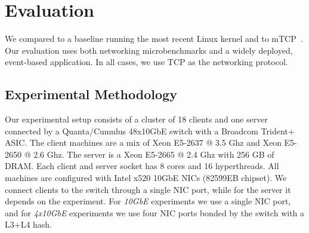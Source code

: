 
\section{Evaluation}
\label{sec:eval}


We compared \ix to a baseline running the most recent Linux kernel and
to mTCP~\cite{jeong2014mtcp}. Our evaluation uses both networking
microbenchmarks and a widely deployed, event-based application. In all
cases, we use TCP as the networking protocol.

\subsection{Experimental Methodology}
\label{sec:eval:setup}



 





Our experimental setup consists of a cluster of 18 clients
and one server connected by
a Quanta/Cumulus 48x10GbE switch with a Broadcom Trident+ ASIC.
The client machines are a mix of Xeon E5-2637 @ 3.5 Ghz and Xeon
E5-2650 @ 2.6 Ghz. The server is a Xeon E5-2665 @ 2.4 Ghz with
256 GB of DRAM.  Each client and server
socket has 8 cores and 16 hyperthreads. All machines are configured
with Intel x520 10GbE NICs (82599EB chipset). We connect clients
to the switch through a single NIC port, while for the server it depends
on the experiment. For \emph{10GbE} experiments we use a single
NIC port, and for \emph{4x10GbE} experiments we use four NIC ports
bonded by the switch with a L3+L4 hash.


